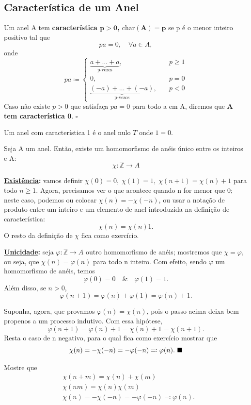 \documentclass[../algebraIII_notes.tex]{subfiles}
\begin{document}
\subsection{Característica de um Anel}
\begin{def*}
	Um anel A tem \textbf{característica \(\mathbf{p>0}\), \(\mathbf{\mathrm{char}(A)=p}\)} se p é o menor inteiro positivo tal que
	\[
		pa = 0,\quad \forall a\in A,
	\]
	onde
	\[
		pa  \coloneqq  \left\{\begin{array}{ll}
			\underbrace{a+\dotsc +a}_{\text{p-vezes}},        & \quad p\geq 1 \\
			0,                                                & \quad p=0     \\
			\underbrace{(-a)+\dotsc + (-a)}_{\text{p-vezes}}, & \quad p<0
		\end{array}\right.
	\]
	Caso não existe \(p>0\) que satisfaça \(pa=0\) para todo a em A, diremos que \textbf{A tem característica 0}. \(\square\)
\end{def*}
\begin{example}
	Um anel com característica 1 é o anel nulo \(T\) onde \(1=0\).
\end{example}
\begin{lemma*}
	Seja A um anel. Então, existe um homomorfismo de anéis único entre os inteiros e A:
	\[
		\chi :\mathbb{Z}\rightarrow A
	\]
\end{lemma*}
\begin{proof*}
	\textbf{\underline{Existência}:} vamos definir \(\chi (0)=0, \; \chi (1)=1,\; \chi (n+1) = \chi (n)+1\) para todo \(n\geq 1\). Agora, precisamos ver o que acontece quando n for menor que 0; neste caso, podemos ou colocar \(\chi (n)=-\chi (-n)\), ou usar a notação de produto entre um inteiro e um elemento de anel introduzida na definição de característica:
	\[
		\chi (n)=\chi (n)1.
	\]
	O resto da definição de \(\chi \) fica como exercício.

	\textbf{\underline{Unicidade}:} seja \(\varphi :\mathbb{Z}\rightarrow A\) outro homomorfismo de anéis; mostremos que \(\chi = \varphi \), ou seja, que \(\chi (n)=\varphi (n)\) para todo n inteiro. Com efeito, sendo \(\varphi \) um homomorfismo de anéis, temos
	\[
		\varphi (0)=0 \quad\&\quad \varphi (1)=1.
	\]
	Além disso, se \(n>0\),
	\[
		\varphi (n+1)=\varphi (n)+\varphi (1) = \varphi (n)+1.
	\]

	Suponha, agora, que provamos \(\varphi (n)=\chi (n)\), pois o passo acima deixa bem propenos a um processo indutivo. Com essa hipótese,
	\[
		\varphi (n+1)=\varphi (n)+1 = \chi (n)+1 = \chi (n+1).
	\]
	Resta o caso de n negativo, para o qual fica como exercício mostrar que
	\[
		\chi (n)=-\chi (-n)=-\varphi (-n)\eqqcolon\varphi (n). \text{ $\blacksquare$}
	\]
\end{proof*}
\begin{exr}
	Mostre que
	\begin{align*}
		 & \chi (n+m)=\chi (n)+\chi (m)                           \\
		 & \chi (nm)=\chi (n)\chi (m)                             \\
		 & \chi (n)=-\chi (-n)=-\varphi (-n)\eqqcolon\varphi (n).
	\end{align*}
\end{exr}
\end{document}
